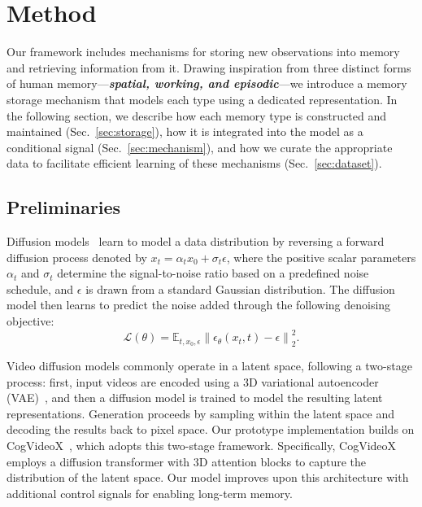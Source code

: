 \section{Method}
\label{sec:method}

Our framework includes mechanisms for storing new observations into memory and retrieving information from it. Drawing inspiration from three distinct forms of human memory—\textbf{\textit{spatial, working, and episodic}}—we introduce a memory storage mechanism that models each type using a dedicated representation. In the following section, we describe how each memory type is constructed and maintained (Sec.~\ref{sec:storage}), how it is integrated into the model as a conditional signal (Sec.~\ref{sec:mechanism}), and how we curate the appropriate data to facilitate efficient learning of these mechanisms (Sec.~\ref{sec:dataset}).

\subsection{Preliminaries}
Diffusion models~\cite{sohl2015deep,ho2020denoising,song2021score} learn to model a data distribution by reversing a forward diffusion process denoted by $x_t = \alpha_t x_0 + \sigma_t \epsilon$, where the positive scalar parameters $\alpha_t$ and $\sigma_t$ determine the signal-to-noise ratio based on a predefined noise schedule, and $\epsilon$ is drawn from a standard Gaussian distribution. The diffusion model then learns to predict the noise added through the following denoising objective:
\begin{equation}
    \mathcal{L}(\theta) = \mathbb{E}_{t, x_0, \epsilon}\left\|\epsilon_{\theta}(x_t, t) - \epsilon\right\|_2^2.
    \label{eq:denoising_loss}
\end{equation}

Video diffusion models commonly operate in a latent space, following a two-stage process: first, input videos are encoded using a 3D variational autoencoder (VAE)~\cite{villegas2023phenaki,gupta2024photorealistic,videoworldsimulators2024}, and then a diffusion model is trained to model the resulting latent representations. Generation proceeds by sampling within the latent space and decoding the results back to pixel space. Our prototype implementation builds on CogVideoX~\cite{yang2024cogvideox}, which adopts this two-stage framework. Specifically, CogVideoX employs a diffusion transformer with 3D attention blocks to capture the distribution of the latent space. Our model improves upon this architecture with additional control signals for enabling long-term memory.

